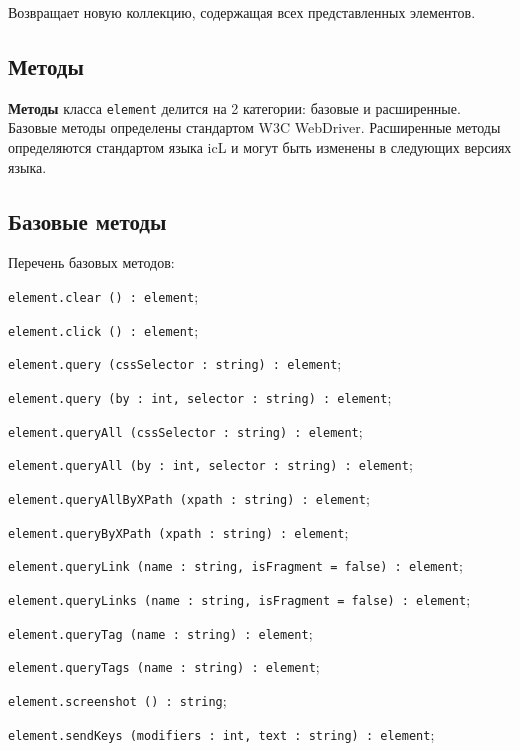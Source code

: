 Возвращает новую коллекцию, содержащая всех представленных элементов.

\subsection{Методы}

{\bf Методы} класса \texttt{element} делится на 2 категории: базовые и расширенные. Базовые методы определены стандартом W3C WebDriver. Расширенные методы определяются стандартом языка icL и могут быть изменены в следующих версиях языка.

\subsection{Базовые методы}

Перечень базовых методов:
\begin{icItems}
    \item \texttt{element.clear () : element};
	\item \texttt{element.click () : element};
	\item \texttt{element.query (cssSelector : string) : element};
	\item \texttt{element.query (by : int, selector : string) : element};
	\item \texttt{element.queryAll (cssSelector : string) : element};
	\item \texttt{element.queryAll (by : int, selector : string) : element};
	\item \texttt{element.queryAllByXPath (xpath : string) : element};
	\item \texttt{element.queryByXPath (xpath : string) : element};
	\item \texttt{element.queryLink (name : string, isFragment = false) : element};
	\item \texttt{element.queryLinks (name : string, isFragment = false) : element};
	\item \texttt{element.queryTag (name : string) : element};
	\item \texttt{element.queryTags (name : string) : element};
	\item \texttt{element.screenshot () : string};
	\item \texttt{element.sendKeys (modifiers : int, text : string) : element};
\end{icItems}

